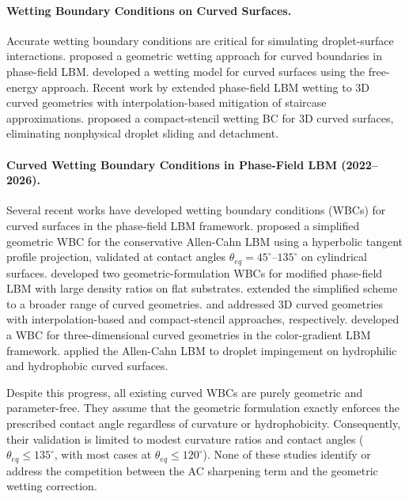 \paragraph{Wetting Boundary Conditions on Curved Surfaces.}
Accurate wetting boundary conditions are critical for simulating droplet-surface interactions. \citet{fakhari2017diffuse} proposed a geometric wetting approach for curved boundaries in phase-field LBM. \citet{connington2013lattice} developed a wetting model for curved surfaces using the free-energy approach. Recent work by \citet{sashko2024phase} extended phase-field LBM wetting to 3D curved geometries with interpolation-based mitigation of staircase approximations. \citet{compact2025stencil} proposed a compact-stencil wetting BC for 3D curved surfaces, eliminating nonphysical droplet sliding and detachment.

\paragraph{Curved Wetting Boundary Conditions in Phase-Field LBM (2022--2026).}
Several recent works have developed wetting boundary conditions (WBCs) for curved surfaces in the phase-field LBM framework. \citet{huang2022simplified} proposed a simplified geometric WBC for the conservative Allen-Cahn LBM using a hyperbolic tangent profile projection, validated at contact angles $\theta_{eq} = 45^\circ$--$135^\circ$ on cylindrical surfaces. \citet{zhang2022wetting} developed two geometric-formulation WBCs for modified phase-field LBM with large density ratios on flat substrates. \citet{huang2023simplified} extended the simplified scheme to a broader range of curved geometries. \citet{sashko2024phase} and \citet{compact2025stencil} addressed 3D curved geometries with interpolation-based and compact-stencil approaches, respectively. \citet{wang2024wetting} developed a WBC for three-dimensional curved geometries in the color-gradient LBM framework. \citet{ezzatneshan2021studying} applied the Allen-Cahn LBM to droplet impingement on hydrophilic and hydrophobic curved surfaces.

Despite this progress, all existing curved WBCs are purely geometric and parameter-free. They assume that the geometric formulation exactly enforces the prescribed contact angle regardless of curvature or hydrophobicity. Consequently, their validation is limited to modest curvature ratios and contact angles ($\theta_{eq} \leq 135^\circ$, with most cases at $\theta_{eq} \leq 120^\circ$). None of these studies identify or address the competition between the AC sharpening term and the geometric wetting correction.

